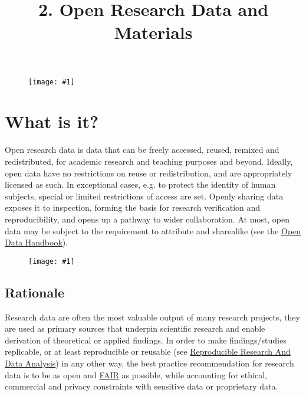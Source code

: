 \documentclass{article}
\newlength{\imgwidth}
\newcommand\scaledgraphics[2]{%
                
\settowidth{\imgwidth}{\texttt{[image: \#1]}}%
                
\setlength{\imgwidth}{\minof{\imgwidth}{#2\textwidth}}%
                
\texttt{[image: \#1]}%
                
}
\begin{document}
\title{2. Open Research Data and Materials}

\maketitle


\section{}\label{H5302207}





\begin{figure}
\scaledgraphics{d4b3f9d8-436f-4d74-be10-f968d456433a.png}{1}
\label{F73092151}
\end{figure}


\section{What is it?}\label{H4225958}



Open research data is data that can be freely accessed, reused, remixed and redistributed, for academic research and teaching purposes and beyond. Ideally, open data have no restrictions on reuse or redistribution, and are appropriately licensed as such. In exceptional cases, e.g. to protect the identity of human subjects, special or limited restrictions of access are set. Openly sharing data exposes it to inspection, forming the basis for research verification and reproducibility, and opens up a pathway to wider collaboration. At most, open data may be subject to the requirement to attribute and sharealike (see the \href{http://opendatahandbook.org/guide/en/what-is-open-data}{Open Data Handbook}).

\begin{figure}
\scaledgraphics{4f4bbd4c-c03a-4308-bb10-30aea0e9b079.png}{1}
\label{F54037081}
\end{figure}


\subsection{Rationale}\label{rationale}



Research data are often the most valuable output of many research projects, they are used as primary sources that underpin scientific research and enable derivation of theoretical or applied findings. In order to make findings/studies replicable, or at least reproducible or reusable (see \href{https://github.com/Open-Science-Training-Handbook/Open-Science-Training-Handbook_EN/blob/master/02OpenScienceBasics/04ReproducibleResearchAndDataAnalysis.md}{Reproducible Research And Data Analysis}) in any other way, the best practice recommendation for research data is to be as open and \href{https://www.force11.org/fairprinciples}{FAIR} as possible, while accounting for ethical, commercial and privacy constraints with sensitive data or proprietary data.
\end{document}
